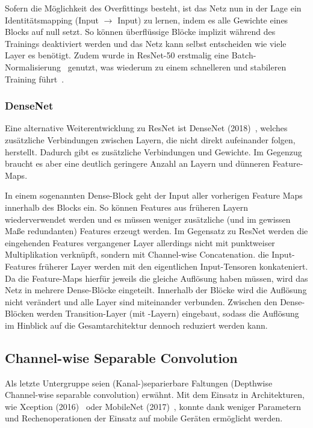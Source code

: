 Sofern die Möglichkeit des Overfittings besteht, ist das Netz nun in der Lage ein Identitätsmapping (Input $\to$ Input) zu lernen, indem es alle Gewichte eines Blocks auf null setzt.
So können überflüssige Blöcke implizit während des Trainings deaktiviert werden und das Netz kann selbst entscheiden wie viele Layer es benötigt.
Zudem wurde in ResNet-50 erstmalig eine Batch-Normalisierung~\cite{Ioffe15} genutzt, was wiederum zu einem schnelleren und stabileren Training führt~\cite{Gugger20}.

\subsubsection*{DenseNet}

Eine alternative Weiterentwicklung zu ResNet ist DenseNet (2018)~\cite{Huang18}, welches zusätzliche Verbindungen zwischen Layern, die nicht direkt aufeinander folgen, herstellt.
Dadurch gibt es zusätzliche Verbindungen und Gewichte.
Im Gegenzug braucht es aber eine deutlich geringere Anzahl an Layern und dünneren Feature-Maps.

In einem sogenannten Dense-Block geht der Input aller vorherigen Feature Maps innerhalb des Blocks ein.
So können Features aus früheren Layern wiederverwendet werden und es müssen weniger zusätzliche (und im gewissen Maße redundanten) Features erzeugt werden.
Im Gegensatz zu ResNet werden die eingehenden Features vergangener Layer allerdings nicht mit punktweiser Multiplikation verknüpft, sondern mit \sog Channel-wise Concatenation.
\Dh die Input-Features früherer Layer werden mit den eigentlichen Input-Tensoren konkateniert.
Da die Feature-Maps hierfür jeweils die gleiche Auflösung haben müssen, wird das Netz in mehrere Dense-Blöcke eingeteilt.
Innerhalb der Blöcke wird die Auflösung nicht verändert und alle Layer sind miteinander verbunden.
Zwischen den Dense-Blöcken werden Transition-Layer (\ua mit \pool-Layern) eingebaut, sodass die Auflösung im Hinblick auf die Gesamtarchitektur dennoch reduziert werden kann.

\subsection{Channel-wise Separable Convolution}
\label{subsec:group-conv}

Als letzte Untergruppe seien (Kanal-)separierbare Faltungen (Depthwise \bzw Channel-wise separable convolution) erwähnt.
Mit dem Einsatz in Architekturen, wie Xception (2016)~\cite{Chollet17} oder MobileNet (2017)~\cite{Howard17}, konnte \ua dank weniger Parametern und Rechenoperationen der Einsatz auf mobile Geräten ermöglicht werden.

